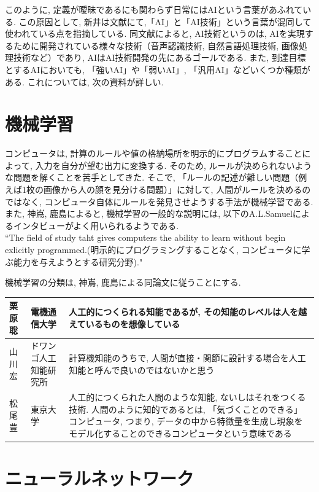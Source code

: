 \documentclass{suribt}
\begin{document}
このように, 定義が曖昧であるにも関わらず日常にはAIという言葉があふれている. この原因として, 新井は文献\cite{Arai-2018}にて,「AI」と「AI技術」という言葉が混同して使われている点を指摘している. 同文献によると, AI技術というのは, AIを実現するために開発されている様々な技術（音声認識技術, 自然言語処理技術, 画像処理技術など）であり, AIはAI技術開発の先にあるゴールである. また, 到達目標とするAIにおいても, 「強いAI」や「弱いAI」, 「汎用AI」などいくつか種類がある. これについては, 次の資料が詳しい\cite{System-2019}.
\section{機械学習}
コンピュータは, 計算のルールや値の格納場所を明示的にプログラムすることによって, 入力を自分が望む出力に変換する. そのため, ルールが決められないような問題を解くことを苦手としてきた. そこで, 「ルールの記述が難しい問題（例えば1枚の画像から人の顔を見分ける問題）」に対して, 人間がルールを決めるのではなく, コンピュータ自体にルールを発見させようする手法が機械学習である. また, 神嶌, 鹿島によると, 機械学習の一般的な説明には, 以下のA.L.Samuelによるインタビューがよく用いられるようである\cite{Kamishima-2019}.\\
``The field of study taht gives computers the ability to learn without begin exlicitly programmed.(明示的にプログラミングすることなく, コンピュータに学ぶ能力を与えようとする研究分野)."

機械学習の分類は, 神嶌, 鹿島による同論文に従うことにする. 

\begin{table}[htb]
	\begin{tabular}{l|l|p{7cm}}
		\hline
		栗原聡 & 電機通信大学 & 人工的につくられる知能であるが, その知能のレベルは人を越えているものを想像している \\ \hline
		山川宏 & ドワンゴ人工知能研究所 & 計算機知能のうちで, 人間が直接・関節に設計する場合を人工知能と呼んで良いのではないかと思う \\ \hline
		松尾豊 & 東京大学 & 人工的につくられた人間のような知能, ないしはそれをつくる技術. 人間のように知的であるとは, 「気づくことのできる」コンピュータ, つまり, データの中から特徴量を生成し現象をモデル化することのできるコンピュータという意味である \\
		\hline
	\end{tabular}
\end{table}


\section{ニューラルネットワーク}
\end{document}

